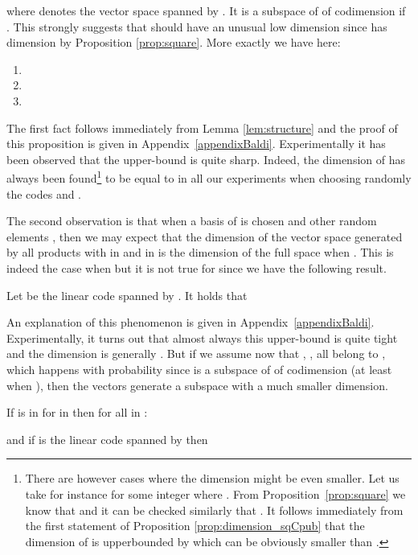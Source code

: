 \documentclass[runningheads,11pt]{llncs}
\begin{document}
where  denotes the vector space spanned by . 
It is a subspace of  of codimension  if .
This strongly suggests that  should have an unusual
low dimension since   has dimension   by
Proposition \ref{prop:square}. 
More  exactly we have here:


\begin{proposition}
\label{prop:dimension_sqCpub}
\begin{enumerate}
\item[]
\item 
\item 
\end{enumerate}
\end{proposition}

\medskip

The first fact follows immediately from Lemma \ref{lem:structure} and the proof
of this proposition is given in Appendix~\ref{appendixBaldi}. Experimentally it has been observed that the upper-bound 
is quite sharp. Indeed, the dimension of  has always been
found\footnote{There are however cases where the dimension might be
  even smaller. Let us take for instance
 for some integer  
where . From Proposition~\ref{prop:square} we know that
 and it can be checked similarly that 
. It follows immediately from the first statement of
Proposition \ref{prop:dimension_sqCpub} that the dimension of 
 is upperbounded by  which can be obviously smaller than
.} to be equal to  in all our experiments when choosing randomly the
codes and . 

\medskip

The second observation is that when a basis 
 of  is chosen and  other random elements , then we may expect that 
the dimension of the vector space generated by all products  with  in  and  in 
 is the dimension of the full space  when
. This is indeed the case when  
but it is not true for  since we have the following result.
\begin{proposition}\label{prop:three} Let  be the linear code spanned by . It holds that

\end{proposition}
An explanation of this phenomenon is given in Appendix~\ref{appendixBaldi}. Experimentally, it turns out that almost always this upper-bound
is quite tight and the dimension is generally . But if we assume
now that , ,  all belong to
, which happens with probability  since  is 
a subspace of  of codimension  (at least when ),
then the vectors  generate a subspace with  a much
smaller dimension.
\begin{proposition}\label{prop:attack}
If  is in  for  in 
then for all  in 
:

and if  is the linear code spanned by  then

\end{proposition}
\end{document}
